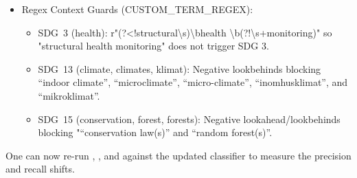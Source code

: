 \begin{itemize}
\begin{itemize}
\item S\gls{SDG}~9: Excluded \enquote{finite element}, \enquote{finite element method}, \enquote{finita element}, \enquote{lca}, and \enquote{CFD}.

\item \gls{SDG}~10: Excluded bare \enquote{equity}, \enquote{tillgänglighet}, \enquote{poverty}, and \enquote{public housing}.

\item \gls{SDG}~11: Excluded bare \enquote{waste}, \enquote{recycling}, and \enquote{waste management}.

\item \gls{SDG}~12: Excluded \enquote{energy efficiency}, \enquote{energy savings}, \enquote{energy saving}, \enquote{energy efficient}, \enquote{energy-efficient}, \enquote{thermal energy storage}, and \enquote{viscosity}.

\item \gls{SDG}~13: Excluded \enquote{LCA}, \enquote{life cycle assessment}, \enquote{livscykelanalys}, \enquote{livscykelanalyser} (moved to SDG 12).

\item \gls{SDG}~16: Excluded bare \enquote{institution} and \enquote{institutionell}.   
\end{itemize}

\item Regex Context Guards (CUSTOM\_TERM\_REGEX):
\begin{itemize}
\item \gls{SDG}~3 (health): r"(?<!structural\textbackslash s)\textbackslash bhealth \textbackslash b(?!\textbackslash s+monitoring)" so "structural health monitoring" does not trigger SDG 3.

\item \gls{SDG}~13 (climate, climates, klimat): Negative lookbehinds blocking \enquote{indoor climate}, \enquote{microclimate}, \enquote{micro-climate}, \enquote{inomhusklimat}, and \enquote{mikroklimat}.

\item \gls{SDG}~15 (conservation, forest, forests): Negative lookahead/lookbehinds blocking "\enquote{conservation law(s)} and \enquote{random forest(s)}.
\end{itemize}
\end{itemize}

One can now re-run , , and  against the updated classifier to measure the precision and recall shifts.

